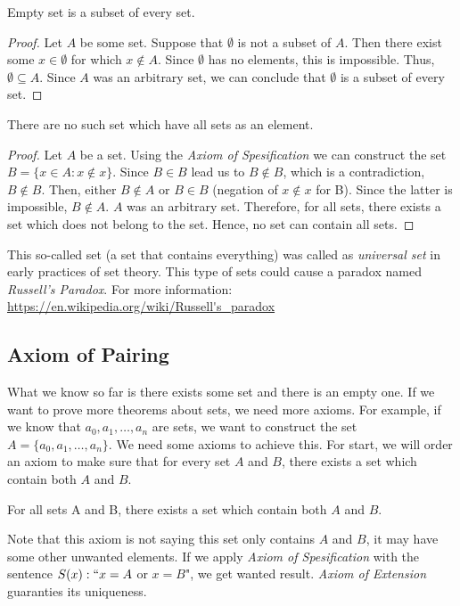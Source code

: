 \begin{theorem*} Empty set is a subset of every set.\end{theorem*}
\begin{proof}
  Let $A$ be some set. Suppose that $\emptyset$ is not a subset of $A$.
  Then there exist some $x \in \emptyset $ for which $x \not\in A$.
  Since $\emptyset$ has no elements, this is impossible. Thus, 
  $\emptyset \subseteq A$. Since $A$ was an arbitrary set, we can conclude
  that $\emptyset$ is a subset of every set.
\end{proof}

\begin{theorem*} There are no such set which have all sets as an element.\end{theorem*}
\begin{proof}
    Let $A$ be a set. Using the \textit{Axiom of Spesification} we can
    construct the set $B = \{x \in A : x \notin x\}$. Since $B \in B$ lead 
    us to $B \notin B$, which is a contradiction, $B \notin B$.
    Then, either $B \notin A$ or $B \in B$ (negation of $x \notin x$ for B). 
    Since the latter is impossible, $B \notin A$. $A$ was an arbitrary set.
    Therefore, for all sets, there exists a set which does not belong 
    to the set. Hence, no set can contain all sets.
\end{proof}

This so-called set (a set that contains everything) was called as
\textit{universal set} in early practices of set theory.
This type of sets could cause a paradox named \textit{Russell's Paradox}.
For more information: \url{https://en.wikipedia.org/wiki/Russell's_paradox}


\subsection{Axiom of Pairing}
What we know so far is there exists some set and there is an empty one.
If we want to prove more theorems about sets, we need more axioms.
For example, if we know that $a_0,a_1,\dots,a_n$ are sets, we want
to construct the set $A = \{a_0,a_1,\dots,a_n\}.$ We need some axioms
to achieve this. For start, we will order an axiom to make sure that
for every set $A$ and $B$, there exists a set which contain both $A$ 
and $B$.

\begin{axiom*} For all sets A and B, there 
exists a set which contain both $A$ and $B$.\end{axiom*}
Note that this axiom is not saying this set only contains $A$ and $B$,
it may have some other unwanted elements. If we apply 
\textit{Axiom of Spesification} with the sentence $S(x): ``x=A$ or $x=B$",
we get wanted result. \textit{Axiom of Extension} guaranties its 
uniqueness.

